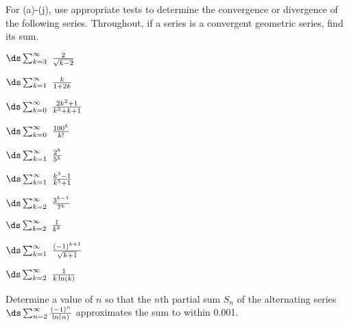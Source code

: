 \begin{activity} \label{8.4.Act6}  For (a)-(j), use appropriate tests to determine the convergence or divergence of the following series. Throughout, if a series is a convergent geometric series, find its sum.
\ba
\item $\ds \sum_{k=3}^{\infty} \ \frac{2}{\sqrt{k-2}}$
	
\item $\ds \sum_{k=1}^{\infty} \ \frac{k}{1+2k}$

\item $\ds \sum_{k=0}^{\infty} \ \frac{2k^2+1}{k^3+k+1}$

\item $\ds \sum_{k=0}^{\infty} \ \frac{100^k}{k!}$ 

\item $\ds \sum_{k=1}^{\infty} \ \frac{2^k}{5^k}$

\item $\ds \sum_{k=1}^{\infty} \ \frac{k^3-1}{k^5+1}$

\item $\ds \sum_{k=2}^{\infty} \ \frac{3^{k-1}}{7^k}$

\item $\ds \sum_{k=2}^{\infty} \ \frac{1}{k^k}$

\item $\ds \sum_{k=1}^{\infty} \ \frac{(-1)^{k+1}}{\sqrt{k+1}}$

\item $\ds \sum_{k=2}^{\infty} \ \frac{1}{k \ln(k)}$

\item Determine a value of $n$ so that the $n$th partial sum $S_n$ of the alternating series $\ds \sum_{n=2}^{\infty} \frac{(-1)^n}{\ln(n)}$ approximates the sum to within 0.001.
\ea
\end{activity}

